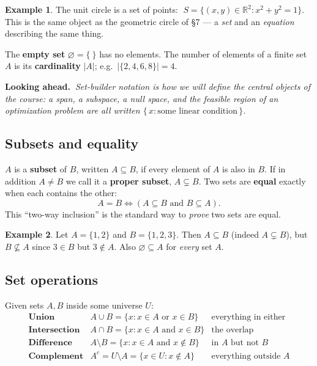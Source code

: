 \documentclass[11pt]{article}
\theoremstyle{definition}
\newtheorem{example}{Example}[section]
\newcommand{\lookahead}[1]{%
  \par\smallskip\noindent
  {\sffamily\bfseries\color{BrickRed}Looking ahead.~}\textit{#1}\par\smallskip}
\newcommand{\R}{\mathbb{R}}
\begin{document}
\begin{example}
The unit circle is a set of points: $\;S=\{(x,y)\in\R^2 : x^2+y^2=1\}$. This is
the same object as the geometric circle of \S7 --- a \emph{set} and an
\emph{equation} describing the same thing.
\end{example}

The \textbf{empty set} $\varnothing=\{\ \}$ has no elements. The number of
elements of a finite set $A$ is its \textbf{cardinality} $|A|$; e.g.\
$|\{2,4,6,8\}|=4$.

\lookahead{Set-builder notation is how we will \emph{define} the central objects
of the course: a span, a subspace, a null space, and the feasible region of an
optimization problem are all written $\{\,x : \text{some linear condition}\,\}$.}

\subsection{Subsets and equality}
$A$ is a \textbf{subset} of $B$, written $A\subseteq B$, if every element of $A$
is also in $B$. If in addition $A\neq B$ we call it a \textbf{proper subset},
$A\subsetneq B$. Two sets are \textbf{equal} exactly when each contains the other:
\[
A=B \iff (A\subseteq B \text{ and } B\subseteq A).
\]
This ``two-way inclusion'' is the standard way to \emph{prove} two sets are equal.

\begin{example}
Let $A=\{1,2\}$ and $B=\{1,2,3\}$. Then $A\subseteq B$ (indeed $A\subsetneq B$),
but $B\not\subseteq A$ since $3\in B$ but $3\notin A$. Also $\varnothing\subseteq A$
for \emph{every} set $A$.
\end{example}

\subsection{Set operations}
Given sets $A,B$ inside some universe $U$:
\[
\begin{array}{lll}
\textbf{Union} & A\cup B=\{x: x\in A \text{ or } x\in B\} & \text{everything in either}\\[2pt]
\textbf{Intersection} & A\cap B=\{x: x\in A \text{ and } x\in B\} & \text{the overlap}\\[2pt]
\textbf{Difference} & A\setminus B=\{x: x\in A \text{ and } x\notin B\} & \text{in $A$ but not $B$}\\[2pt]
\textbf{Complement} & A^{c}=U\setminus A=\{x\in U: x\notin A\} & \text{everything outside $A$}
\end{array}
\]
\end{document}
